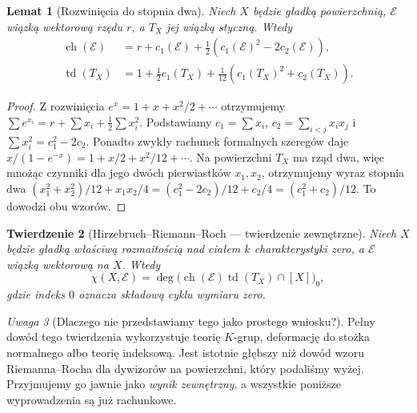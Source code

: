 \documentclass[11pt,a4paper,openany]{report}
\numberwithin{equation}{section}
\theoremstyle{plain}
\newtheorem{twierdzenie}{Twierdzenie}[section]
\newtheorem{lemat}[twierdzenie]{Lemat}
\theoremstyle{definition}
\theoremstyle{remark}
\newtheorem{uwaga}[twierdzenie]{Uwaga}
\begin{document}
\begin{lemat}[Rozwinięcia do stopnia dwa]
\label{lem:ga7-ch-td-surface}
Niech $X$ będzie gładką powierzchnią,
$\mathcal E$ wiązką wektorową rzędu $r$,
a $T_X$ jej wiązką styczną. Wtedy
\[
\begin{aligned}
\operatorname{ch}(\mathcal E)&=r+c_1(\mathcal E)
+\tfrac12(c_1(\mathcal E)^2-2c_2(\mathcal E)),\\
\operatorname{td}(T_X)&=1+\tfrac12 c_1(T_X)
+\tfrac1{12}(c_1(T_X)^2+c_2(T_X)).
\end{aligned}
\]
\end{lemat}
\begin{proof}
Z rozwinięcia $e^x=1+x+x^2/2+\cdots$ otrzymujemy
$\sum e^{x_i}=r+\sum x_i+\frac12\sum x_i^2$.
Podstawiamy
$c_1=\sum x_i$, $c_2=\sum_{i<j}x_ix_j$ i
$\sum x_i^2=c_1^2-2c_2$.
Ponadto zwykły rachunek formalnych szeregów daje
$x/(1-e^{-x})=1+x/2+x^2/12+\cdots$.
Na powierzchni $T_X$ ma rząd dwa, więc mnożąc
czynniki dla jego dwóch pierwiastków
$x_1,x_2$, otrzymujemy wyraz stopnia dwa
$(x_1^2+x_2^2)/12+x_1x_2/4
=(c_1^2-2c_2)/12+c_2/4=(c_1^2+c_2)/12$.
To dowodzi obu wzorów.
\end{proof}

\begin{twierdzenie}[Hirzebruch--Riemann--Roch — twierdzenie zewnętrzne]
\label{tw:ga7-hrr}
Niech $X$ będzie gładką właściwą rozmaitością nad
ciałem $k$ charakterystyki zero, a $\mathcal E$
wiązką wektorową na $X$. Wtedy
\[
\chi(X,\mathcal E)=\deg\bigl(
\operatorname{ch}(\mathcal E)\operatorname{td}(T_X)
\cap[X]\bigr)_{0},
\]
gdzie indeks $0$ oznacza składową cyklu wymiaru zero.
\end{twierdzenie}

\begin{uwaga}[Dlaczego nie przedstawiamy tego jako prostego wniosku?]
Pełny dowód tego twierdzenia wykorzystuje
teorię $K$-grup, deformację do stożka normalnego
albo teorię indeksową. Jest istotnie
głębszy niż dowód wzoru Riemanna--Rocha dla dywizorów
na powierzchni, który podaliśmy wyżej.
Przyjmujemy go jawnie jako \emph{wynik zewnętrzny},
a wszystkie poniższe wyprowadzenia są już rachunkowe.
\end{uwaga}
\end{document}
